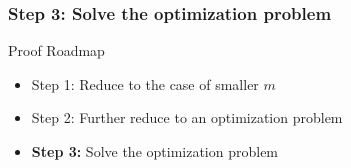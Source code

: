 \documentclass{beamer}
\newcommand*{\ex}{\textnormal{ex}}
\begin{document}
\begin{frame}
  \frametitle{Step 3: Solve the optimization problem}

  Proof Roadmap

  \begin{itemize}
    \item Step 1: Reduce to the case of smaller $m$
    \item Step 2: Further reduce to an optimization problem
    \item \textbf{Step 3:} Solve the optimization problem
  \end{itemize}
\end{frame}
















\end{document}
